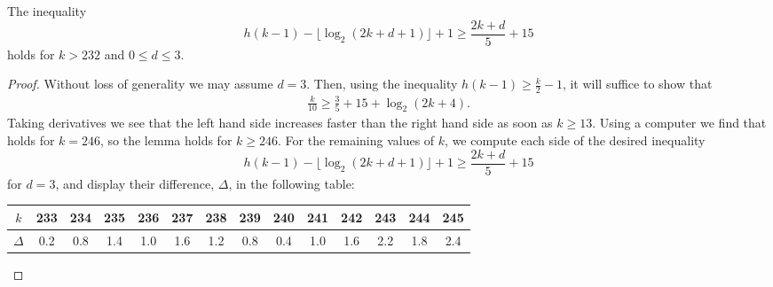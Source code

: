 \begin{lem}\label{lemm:inequality}
    The inequality \[h(k-1) - \lfloor \log_2(2k+d+1) \rfloor + 1 \geq \frac{2k+d}{5} + 15\] holds for $k > 232$ and $0 \leq d \leq 3$.
\end{lem}

\begin{proof}
  Without loss of generality we may assume $d=3$.
  Then, using the inequality $h(k-1) \geq \frac{k}{2}-1$, it will suffice to show that
  \begin{align}
    \frac{k}{10} \geq \frac{3}{5} + 15 + \log_2 (2k+4). \label{eq:stolz-inequality}
  \end{align}
  Taking derivatives we see that the left hand side increases faster than the right hand side as soon as $k \geq 13$. Using a computer we find that  holds for $k=246$, so the lemma holds for $k \geq 246$. For the remaining values of $k$, we compute each side of the desired inequality
  \[h(k-1) - \lfloor \log_2(2k+d+1) \rfloor + 1 \geq \frac{2k+d}{5} + 15\]
  for $d=3$, and display their difference, $\Delta$, in the following table:

  \begin{table}[ht!]
    \begin{center}
      \begin{tabular}{|c||c|c|c|c|c|c|c|c|c|c|c|c|c|}\hline
        $k$ & 233 & 234 & 235 & 236 & 237 & 238 & 239 & 240 & 241 & 242 & 243 & 244 & 245 \\\hline
        $\Delta$ & 0.2 & 0.8 & 1.4 & 1.0 & 1.6 & 1.2 & 0.8 & 0.4 & 1.0 & 1.6 & 2.2 & 1.8 & 2.4 \\\hline
      \end{tabular}
    \end{center}
  \end{table}
  

\end{proof}
